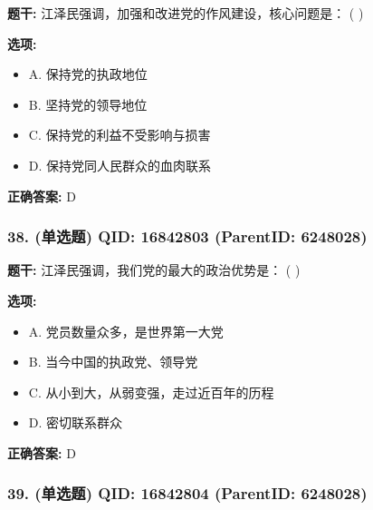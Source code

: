 \documentclass[12pt,UTF8]{ctexart}
\begin{document}
\textbf{题干:}
江泽民强调，加强和改进党的作风建设，核心问题是： ( )



\textbf{选项:}
\begin{itemize}[leftmargin=*]

  \item A. 保持党的执政地位

  \item B. 坚持党的领导地位

  \item C. 保持党的利益不受影响与损害

  \item D. 保持党同人民群众的血肉联系

\end{itemize}

\textbf{正确答案:}
D

\vspace{0.3em}\hrulefill\vspace{0.7em}

\subsubsection*{38. (单选题) \small QID: 16842803 (ParentID: 6248028)}

\textbf{题干:}
江泽民强调，我们党的最大的政治优势是： ( )



\textbf{选项:}
\begin{itemize}[leftmargin=*]

  \item A. 党员数量众多，是世界第一大党

  \item B. 当今中国的执政党、领导党

  \item C. 从小到大，从弱变强，走过近百年的历程

  \item D. 密切联系群众

\end{itemize}

\textbf{正确答案:}
D

\vspace{0.3em}\hrulefill\vspace{0.7em}

\subsubsection*{39. (单选题) \small QID: 16842804 (ParentID: 6248028)}
\end{document}
